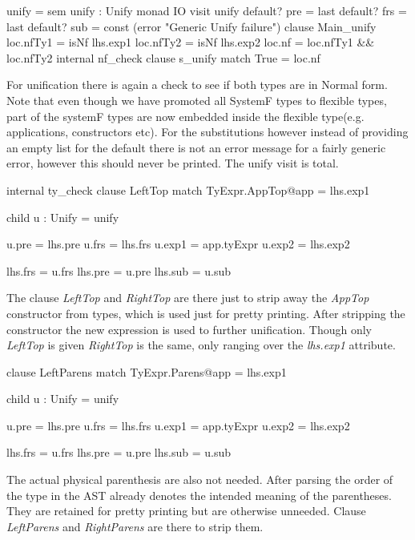 \begin{code}
unify = sem unify : Unify monad IO    
          visit unify
             default? pre = last
             default? frs = last
             default? sub = const (error "Generic Unify failure")
             clause Main_unify
               loc.nfTy1 = isNf lhs.exp1
               loc.nfTy2 = isNf lhs.exp2
               loc.nf    = loc.nfTy1 && loc.nfTy2
               internal nf_check
                 clause s_unify
                   match True  = loc.nf
\end{code}
For unification there is again a check to see if both types are in Normal form. Note that even though we have promoted all SystemF types to flexible types, part of the systemF types are now embedded inside the flexible type(e.g. applications, constructors etc). For the substitutions however instead of providing an empty list for the default there is not an error message for a fairly generic error, however this should never be printed. The unify visit is total.

\begin{code}
                   internal ty_check
                     clause LeftTop
                       match TyExpr.AppTop@app = lhs.exp1
                       
                       child u : Unify = unify
                       
                       u.pre  = lhs.pre
                       u.frs  = lhs.frs
                       u.exp1 = app.tyExpr
                       u.exp2 = lhs.exp2
                       
                       lhs.frs = u.frs
                       lhs.pre = u.pre
                       lhs.sub = u.sub
\end{code}
The clause \emph{LeftTop} and \emph{RightTop} are there just to strip away the \emph{AppTop} constructor from types, which is used just for pretty printing. After stripping the constructor the new expression is used to further unification. Though only \emph{LeftTop} is given \emph{RightTop} is the same, only ranging over the \emph{lhs.exp1} attribute.

\begin{code}
                     clause LeftParens
                       match TyExpr.Parens@app = lhs.exp1
                       
                       child u : Unify = unify
                       
                       u.pre  = lhs.pre
                       u.frs  = lhs.frs
                       u.exp1 = app.tyExpr
                       u.exp2 = lhs.exp2
                       
                       lhs.frs = u.frs
                       lhs.pre = u.pre
                       lhs.sub = u.sub
\end{code}
The actual physical parenthesis are also not needed. After parsing the order of the type in the AST already denotes the intended meaning of the parentheses. They are retained for pretty printing but are otherwise unneeded. Clause \emph{LeftParens} and \emph{RightParens} are there to strip them.


